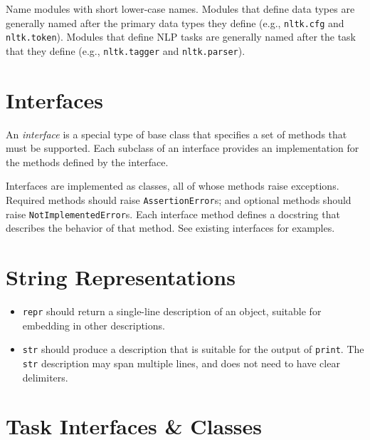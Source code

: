\documentclass{article}
\begin{document}
Name modules with short lower-case names.  Modules that define data
types are generally named after the primary data types they define
(e.g., \texttt{nltk.cfg} and \texttt{nltk.token}).  Modules that
define NLP tasks are generally named after the task that they define
(e.g., \texttt{nltk.tagger} and  \texttt{nltk.parser}).

\section{Interfaces}

An \textit{interface} is a special type of base class that specifies a
set of methods that must be supported.  Each subclass of an interface
provides an implementation for the methods defined by the interface.

Interfaces are implemented as classes, all of whose methods raise
exceptions.  Required methods should raise \texttt{AssertionError}s;
and optional methods should raise \texttt{NotImplementedError}s.  Each
interface method defines a docstring that describes the behavior of
that method.  See existing interfaces for examples.

\section{String Representations}

\begin{itemize}
\item \texttt{repr} should return a single-line description of an
  object, suitable for embedding in other descriptions.
  
\item \texttt{str} should produce a description that is suitable for
  the output of \texttt{print}.  The \texttt{str} description may span
  multiple lines, and does not need to have clear delimiters.
\end{itemize}

\section{Task Interfaces \& Classes}
\end{document}
